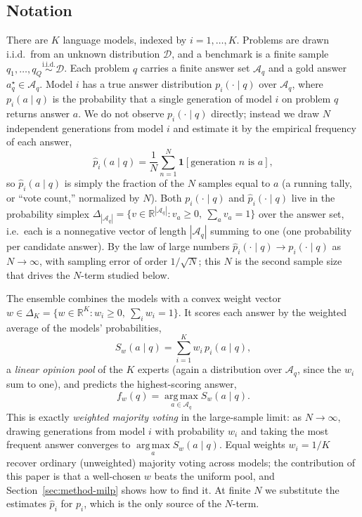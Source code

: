 \documentclass{article} %
\providecommand{\R}{\mathbb{R}}
\providecommand{\argmax}{\mathop{\mathrm{arg\,max}}\limits}
\providecommand{\D}{\mathcal{D}}
\providecommand{\Aq}{\mathcal{A}_q}
\providecommand{\simplex}{\Delta_K}
\providecommand{\phat}{\widehat{p}}
\begin{document}
\subsection{Notation}
\label{sec:method-notation}
There are $K$ language models, indexed by $i=1,\dots,K$. Problems are drawn
i.i.d.\ from an unknown distribution $\D$, and a benchmark is a finite sample
$q_1,\dots,q_Q \overset{\text{i.i.d.}}{\sim} \D$. Each problem $q$ carries a
finite answer set $\Aq$ and a gold answer $a_q^\star \in \Aq$. Model $i$ has a
true answer distribution $p_i(\cdot\mid q)$ over $\Aq$, where $p_i(a\mid q)$ is
the probability that a single generation of model $i$ on problem $q$ returns
answer $a$. We do not observe $p_i(\cdot\mid q)$ directly; instead we draw $N$
independent generations from model $i$ and estimate it by the empirical frequency
of each answer,
\begin{equation}
\label{eq:phat}
\phat_i(a\mid q) = \frac1N\sum_{n=1}^N \mathbf 1[\text{generation }n\text{ is }a],
\end{equation}
so $\phat_i(a\mid q)$ is simply the fraction of the $N$ samples equal to $a$
(a running tally, or ``vote count,'' normalized by $N$). Both $p_i(\cdot\mid q)$
and $\phat_i(\cdot\mid q)$ live in the probability simplex
$\Delta_{|\Aq|}=\{v\in\R^{|\Aq|}:v_a\ge 0,\ \sum_a v_a=1\}$ over the answer set,
i.e.\ each is a nonnegative vector of length $|\Aq|$ summing to one (one
probability per candidate answer). By the law of large numbers
$\phat_i(\cdot\mid q)\to p_i(\cdot\mid q)$ as $N\to\infty$, with sampling error of
order $1/\sqrt N$; this $N$ is the second sample size that drives the $N$-term
studied below.

The ensemble combines the models with a convex weight vector
$w \in \simplex = \{w\in\R^K : w_i\ge 0,\ \sum_i w_i = 1\}$. It scores each answer
by the weighted average of the models' probabilities,
\begin{equation}
\label{eq:score}
S_w(a\mid q) = \sum_{i=1}^K w_i\, p_i(a\mid q),
\end{equation}
a \emph{linear opinion pool} of the $K$ experts (again a distribution over $\Aq$,
since the $w_i$ sum to one), and predicts the highest-scoring answer,
\begin{equation}
\label{eq:predictor-notation}
f_w(q) = \argmax_{a\in\Aq} S_w(a\mid q).
\end{equation}
This is exactly \emph{weighted majority voting} in the large-sample limit: as
$N\to\infty$, drawing generations from model $i$ with probability $w_i$ and
taking the most frequent answer converges to $\argmax_a S_w(a\mid q)$. Equal
weights $w_i=1/K$ recover ordinary (unweighted) majority voting across models; the
contribution of this paper is that a well-chosen $w$ beats the uniform pool, and
Section~\ref{sec:method-milp} shows how to find it. At finite $N$ we substitute
the estimates $\phat_i$ for $p_i$, which is the only source of the $N$-term.
\end{document}
